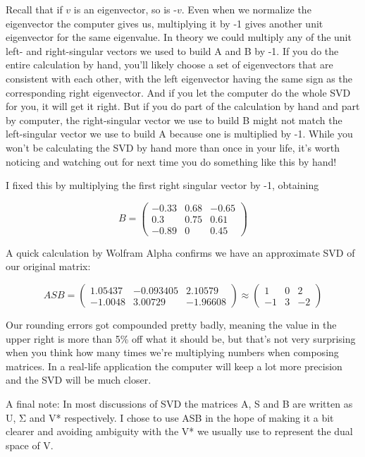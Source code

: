 \documentclass[oneside,english]{amsbook}
\numberwithin{section}{chapter}
\theoremstyle{plain}
\theoremstyle{definition}
\begin{document}
Recall that if $v$ is an eigenvector, so is -$v$. Even when we
normalize the eigenvector the computer gives us, multiplying it by -1
gives another unit eigenvector for the same eigenvalue. In theory we
could multiply any of the unit left- and right-singular vectors we used
to build A and B by -1. If you do the entire calculation by hand, you'll
likely choose a set of eigenvectors that are consistent with each other,
with the left eigenvector having the same sign as the corresponding
right eigenvector. And if you let the computer do the whole SVD for you,
it will get it right. But if you do part of the calculation by hand and
part by computer, the right-singular vector we use to build B might not
match the left-singular vector we use to build A because one is
multiplied by -1. While you won't be calculating the SVD by hand more
than once in your life, it's worth noticing and watching out for next
time you do something like this by hand!

I fixed this by multiplying the first right singular vector by -1,
obtaining

\[B = \begin{pmatrix}
	- 0.33 & 0.68 & - 0.65 \\
	0.3 & 0.75 & 0.61 \\
	- 0.89 & 0 & 0.45
\end{pmatrix}\]

A quick calculation by Wolfram Alpha confirms we have an approximate SVD
of our original matrix:

\[{ASB = \begin{pmatrix}
		1.05437 & - 0.093405 & 2.10579 \\
		- 1.0048 & 3.00729 & - 1.96608
	\end{pmatrix}
}{\approx \begin{pmatrix}
		1 & 0 & 2 \\
		- 1 & 3 & - 2
\end{pmatrix}}\]

Our rounding errors got compounded pretty badly, meaning the value in
the upper right is more than 5\% off what it should be, but that's not
very surprising when you think how many times we're multiplying numbers
when composing matrices. In a real-life application the computer will
keep a lot more precision and the SVD will be much closer.

A final note: In most discussions of SVD the matrices A, S and B are
written as U, Σ and V* respectively. I chose to use ASB in the hope of
making it a bit clearer and avoiding ambiguity with the V* we usually
use to represent the dual space of V.
\end{document}

